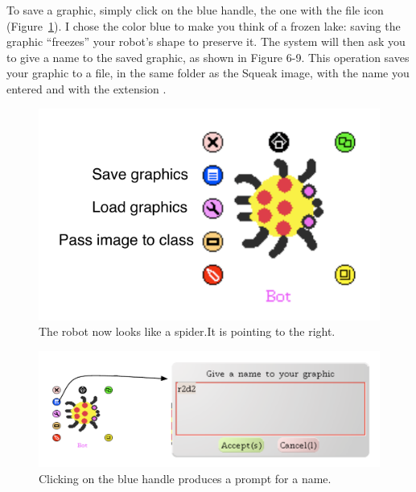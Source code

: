 \documentclass[a4paper,10pt,twoside]{book}
\begin{document}
To save a graphic, simply click on the blue handle, the one with the file icon (Figure~\ref{fig:PicaHaloSaveAndLoadAnnotated}). 
I chose the color blue to make you think of a frozen lake: saving the graphic “freezes” your 
robot’s shape to preserve it. The system will then ask you to give a name to the saved graphic, 
as shown in Figure 6-9. This operation saves your graphic to a file, in the same folder as the 
Squeak image, with the name you entered and with the extension . 

\begin{figure}[h]
\begin{center}
\includegraphics{picaHaloSaveAndLoadAnnotated}
\end{center}
\caption{The robot now looks like a spider.It is pointing to the right.  \label{fig:PicaHaloSaveAndLoadAnnotated}}
\end{figure}

\begin{figure}[h]
\begin{center}
\includegraphics[width=\textwidth]{nameOfSaveAnnotated}
\end{center}
\caption{Clicking on the blue handle produces a prompt for a name.  \label{fig:prompt}}
\end{figure}
\end{document}
